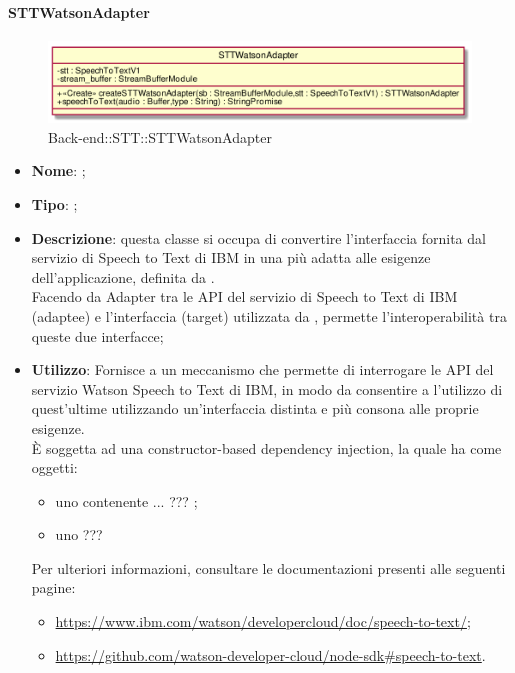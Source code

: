\hypertarget{STTWatsonAdapter_label}{\paragraph{STTWatsonAdapter}}
\begin{figure}[h]
	\centering
	\includegraphics[width=\textwidth,height=\textheight,keepaspectratio]{images/ClassSTTWatsonAdapter.png}
	\caption{Back-end::STT::STTWatsonAdapter}
\end{figure}
\begin{itemize}
	\item \textbf{Nome}: ;
	\item \textbf{Tipo}: ;
	\item \textbf{Descrizione}: questa classe si occupa di convertire l'interfaccia fornita dal servizio di Speech to Text di IBM in una più adatta alle esigenze dell'applicazione, definita da . \\
Facendo da Adapter tra le API del servizio di Speech to Text di IBM (adaptee) e l'interfaccia  (target) utilizzata da , permette l'interoperabilità tra queste due interfacce;
	\item \textbf{Utilizzo}:
Fornisce a  un meccanismo che permette di interrogare le API del servizio Watson Speech to Text di IBM, in modo da consentire a  l'utilizzo di quest'ultime utilizzando un'interfaccia distinta e più consona alle proprie esigenze. \\ È soggetta ad una constructor-based dependency injection, la quale ha come oggetti:
\begin{itemize}
   \item uno  contenente ... ??? ;
   \item uno  ???
\end{itemize}
Per ulteriori informazioni, consultare le documentazioni presenti alle seguenti pagine:
\begin{itemize}
    \item \url{https://www.ibm.com/watson/developercloud/doc/speech-to-text/};
    \item \url{https://github.com/watson-developer-cloud/node-sdk#speech-to-text}.

\end{itemize}
\end{itemize}
